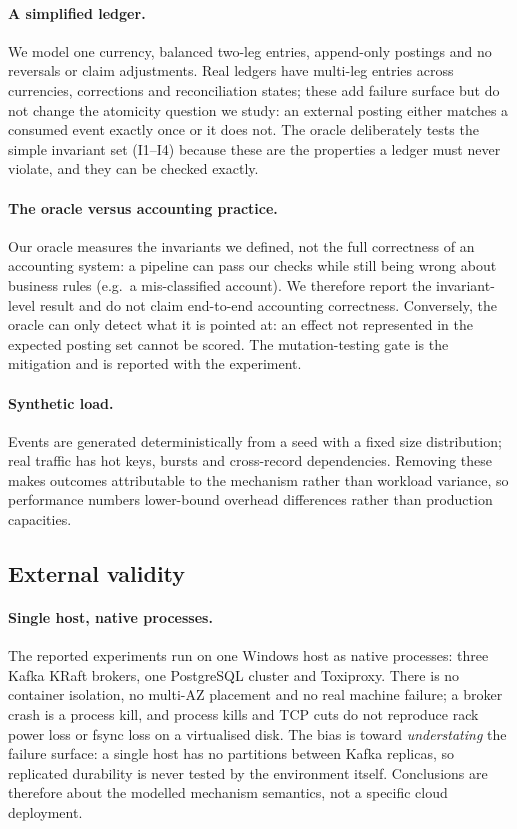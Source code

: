 \paragraph{A simplified ledger.} We model one currency, balanced two-leg entries, append-only
postings and no reversals or claim adjustments. Real ledgers have multi-leg entries across
currencies, corrections and reconciliation states; these add failure surface but do not change
the atomicity question we study: an external posting either matches a consumed event exactly once
or it does not. The oracle deliberately tests the simple invariant set (I1--I4) because these are
the properties a ledger must never violate, and they can be checked exactly.

\paragraph{The oracle versus accounting practice.} Our oracle measures the invariants we defined,
not the full correctness of an accounting system: a pipeline can pass our checks while still
being wrong about business rules (e.g.\ a mis-classified account). We therefore report the
invariant-level result and do not claim end-to-end accounting correctness. Conversely, the oracle
can only detect what it is pointed at: an effect not represented in the expected posting set
cannot be scored. The mutation-testing gate is the mitigation and is reported with the
experiment.

\paragraph{Synthetic load.} Events are generated deterministically from a seed with a fixed size
distribution; real traffic has hot keys, bursts and cross-record dependencies. Removing these
makes outcomes attributable to the mechanism rather than workload variance, so performance
numbers lower-bound overhead differences rather than production capacities.

\subsection{External validity}
\label{sec:threats-external}

\paragraph{Single host, native processes.} The reported experiments run on one Windows host as
native processes: three Kafka KRaft brokers, one PostgreSQL cluster and Toxiproxy. There is no
container isolation, no multi-AZ placement and no real machine failure; a broker crash is a
process kill, and process kills and TCP cuts do not reproduce rack power loss or fsync loss on a
virtualised disk. The bias is toward \emph{understating} the failure surface: a single host has
no partitions between Kafka replicas, so replicated durability is never tested by the environment
itself. Conclusions are therefore about the modelled mechanism semantics, not a specific cloud
deployment.

